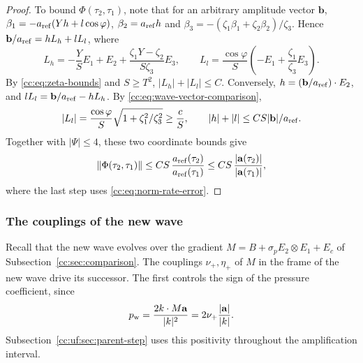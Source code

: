 \begin{proof}
To bound $\Phi(\tau_2,\tau_1)$, note that for an arbitrary amplitude
vector $\mathbf b$,
$\beta_1=-a_{\rm ref}(Yh+l\cos\varphi)$, $\beta_2=a_{\rm ref}h$ and
$\beta_3=-(\zeta_1\beta_1+\zeta_2\beta_2)/\zeta_3$. Hence
$\mathbf b/a_{\rm ref}=hL_h+lL_l$, where
\[
 L_h=-\frac YSE_1+E_2+\frac{\zeta_1Y-\zeta_2}{S\zeta_3}E_3,\qquad
 L_l=\frac{\cos\varphi}{S}\left(-E_1+\frac{\zeta_1}{\zeta_3}E_3\right).
\]
By \eqref{cc:eq:zeta-bounds} and $S\ge T^2$, $|L_h|+|L_l|\le C$.
Conversely,
$h=(\mathbf b/a_{\rm ref})\cdot E_2$, and
$lL_l=\mathbf b/a_{\rm ref}-hL_h$. By
\eqref{cc:eq:wave-vector-comparison},
\[
 |L_l|=\frac{\cos\varphi}{S}
          \sqrt{1+\zeta_1^2/\zeta_3^2}\ge\frac cS,
 \qquad |h|+|l|\le CS|\mathbf b|/a_{\rm ref}.
\]
Together with $|\Psi|\le4$, these two coordinate bounds give
\[
 \|\Phi(\tau_2,\tau_1)\|
 \le CS\,\frac{a_{\rm ref}(\tau_2)}{a_{\rm ref}(\tau_1)}
 \le CS\,\frac{|\mathbf a(\tau_2)|}{|\mathbf a(\tau_1)|},
\]
where the last step uses \eqref{cc:eq:norm-rate-error}.
\end{proof}

\subsubsection{The couplings of the new wave}
Recall that the new wave evolves over the gradient
$M=B+\sigma_pE_2\otimes E_1+E_c$ of Subsection~\ref{cc:sec:comparison}.
The couplings $\nu_+,\eta_+$ of $M$ in the frame of the new wave drive
its successor. The first controls the sign of the pressure coefficient,
since
\[
 p_{\rm w}=\frac{2k\cdot M\mathbf a}{|k|^2}
          =2\nu_+\frac{|\mathbf a|}{|k|}.
\]
Subsection~\ref{cc:uf:sec:parent-step} uses this positivity throughout
the amplification interval.

